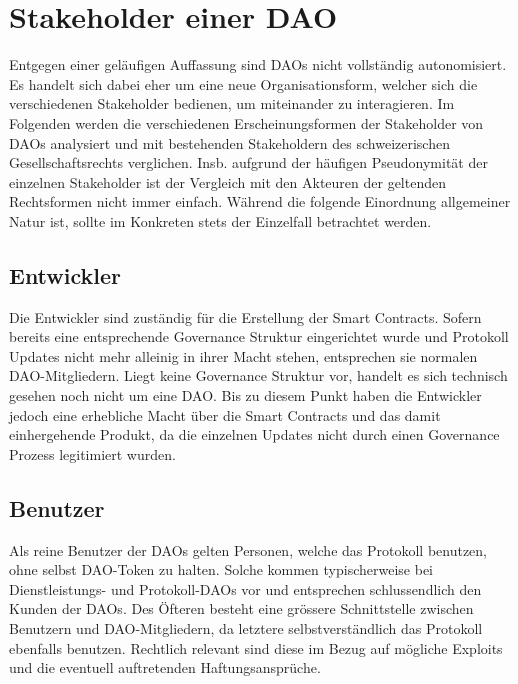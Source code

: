 \documentclass[a4paper,12pt]{report}
\begin{document}
	\section{Stakeholder einer DAO}
	\startsection
    Entgegen einer geläufigen Auffassung sind DAOs nicht vollständig autonomisiert. Es handelt sich dabei eher um eine neue Organisationsform, welcher sich die verschiedenen Stakeholder bedienen, um miteinander zu interagieren. Im Folgenden werden die verschiedenen Erscheinungsformen der Stakeholder von DAOs analysiert und mit bestehenden Stakeholdern des schweizerischen Gesellschaftsrechts verglichen. Insb. aufgrund der häufigen Pseudonymität der einzelnen Stakeholder ist der Vergleich mit den Akteuren der geltenden Rechtsformen nicht immer einfach. Während die folgende Einordnung allgemeiner Natur ist, sollte im Konkreten stets der Einzelfall betrachtet werden.
    
	\subsection{Entwickler}
	\startsubsection
	Die Entwickler sind zuständig für die Erstellung der Smart Contracts. Sofern bereits eine entsprechende Governance Struktur eingerichtet wurde und Protokoll Updates nicht mehr alleinig in ihrer Macht stehen, entsprechen sie normalen DAO-Mitgliedern. Liegt keine Governance Struktur vor, handelt es sich technisch gesehen noch nicht um eine DAO. Bis zu diesem Punkt haben die Entwickler jedoch eine erhebliche Macht über die Smart Contracts und das damit einhergehende Produkt, da die einzelnen Updates nicht durch einen Governance Prozess legitimiert wurden.
	\closesection
	
	\subsection{Benutzer}
	\startsubsection
	Als reine Benutzer der DAOs gelten Personen, welche das Protokoll benutzen, ohne selbst DAO-Token zu halten. Solche kommen typischerweise bei Dienstleistungs- und Protokoll-DAOs vor und entsprechen schlussendlich den Kunden der DAOs. Des Öfteren besteht eine grössere Schnittstelle zwischen Benutzern und DAO-Mitgliedern, da letztere selbstverständlich das Protokoll ebenfalls benutzen. Rechtlich relevant sind diese im Bezug auf mögliche Exploits und die eventuell auftretenden Haftungsansprüche.
	\closesection
	
\end{document}
